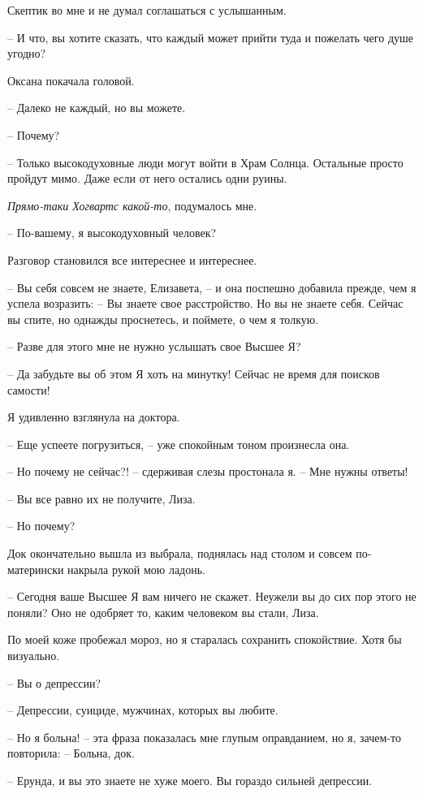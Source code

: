\documentclass[
]{book}
\begin{document}
Скептик во мне и не думал соглашаться с услышанным.

-- И что, вы хотите сказать, что каждый может прийти туда и пожелать чего душе угодно?

Оксана покачала головой.

-- Далеко не каждый, но вы можете.

-- Почему?

-- Только высокодуховные люди могут войти в Храм Солнца. Остальные просто пройдут мимо. Даже если от него остались одни руины.

\emph{Прямо-таки Хогвартс какой-то}, подумалось мне.

-- По-вашему, я высокодуховный человек?

Разговор становился все интереснее и интереснее.

-- Вы себя совсем не знаете, Елизавета, -- и она поспешно добавила прежде, чем я успела возразить: -- Вы знаете свое расстройство. Но вы не знаете себя. Сейчас вы спите, но однажды проснетесь, и поймете, о чем я толкую.

-- Разве для этого мне не нужно услышать свое Высшее Я?

-- Да забудьте вы об этом Я хоть на минутку! Сейчас не время для поисков самости!

Я удивленно взглянула на доктора.

-- Еще успеете погрузиться, -- уже спокойным тоном произнесла она.

-- Но почему не сейчас?! -- сдерживая слезы простонала я. -- Мне нужны ответы!

-- Вы все равно их не получите, Лиза.

-- Но почему?

Док окончательно вышла из выбрала, поднялась над столом и совсем по-матерински накрыла рукой мою ладонь.

-- Сегодня ваше Высшее Я вам ничего не скажет. Неужели вы до сих пор этого не поняли? Оно не одобряет то, каким человеком вы стали, Лиза.

По моей коже пробежал мороз, но я старалась сохранить спокойствие. Хотя бы визуально.

-- Вы о депрессии?

-- Депрессии, суициде, мужчинах, которых вы любите.

-- Но я больна! -- эта фраза показалась мне глупым оправданием, но я, зачем-то повторила: -- Больна, док.

-- Ерунда, и вы это знаете не хуже моего. Вы гораздо сильней депрессии.
\end{document}
